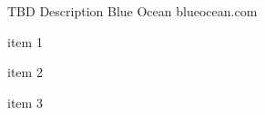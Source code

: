 \begin{cventries}
\cventry
{TBD Description} %
{Blue Ocean} %
{blueocean.com} %
{} %
{
  \begin{cvitems} %
    \item {item 1}
    \item {item 2}
    \item {item 3}
  \end{cvitems}
}

\end{cventries}
